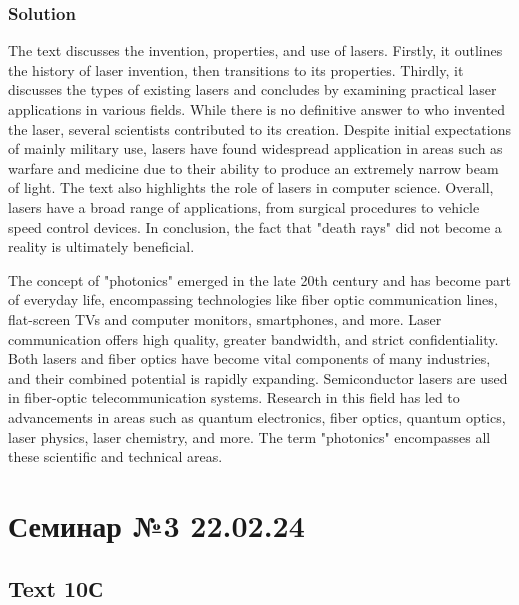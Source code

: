 \subsection*{Solution}
The text discusses the invention, properties, and use of lasers. Firstly, it outlines
the history of laser invention, then transitions to its properties. Thirdly, it
discusses the types of existing lasers and concludes by examining practical laser
applications in various fields. While there is no definitive answer to who invented
the laser, several scientists contributed to its creation. Despite initial expectations
of mainly military use, lasers have found widespread application in areas such as
warfare and medicine due to their ability to produce an extremely narrow beam of
light. The text also highlights the role of lasers in computer science. Overall,
lasers have a broad range of applications, from surgical procedures to vehicle speed
control devices. In conclusion, the fact that "death rays" did not become a reality
is ultimately beneficial.

The concept of "photonics" emerged in the late 20th century and has become part of
everyday life, encompassing technologies like fiber optic communication lines,
flat-screen TVs and computer monitors, smartphones, and more. Laser communication
offers high quality, greater bandwidth, and strict confidentiality. Both lasers and
fiber optics have become vital components of many industries, and their combined
potential is rapidly expanding. Semiconductor lasers are used in fiber-optic
telecommunication systems. Research in this field has led to advancements in areas
such as quantum electronics, fiber optics, quantum optics, laser physics, laser
chemistry, and more. The term "photonics" encompasses all these scientific and
technical areas.

\chapter{Семинар №3 22.02.24}

\section*{Text 10С}

